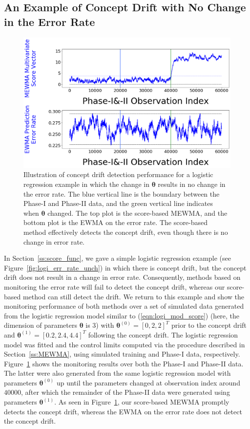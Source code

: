 \documentclass[twoside,11pt]{article}
\begin{document}
\subsection{An Example of Concept Drift with No Change in the Error Rate}
\label{ss:cd_no_err_change}
\begin{figure}[!htp]
\centering
\includegraphics[width = .8\linewidth]{../figures/v14/sim_11/non_nnet_nonunif_ch_f_0_2/1_sim11_logi_1e-08_0_0015_1.png}
  \caption{Illustration of concept drift detection performance for a logistic regression example in which the change in $\bm{\theta}$ results in no change in the error rate. The blue vertical line is the boundary between the Phase-I and Phase-II data, and the green vertical line indicates when $\bm{\theta}$ changed. The top plot is the score-based MEWMA, and the bottom plot is the EWMA on the error rate. The score-based method effectively detects the concept drift, even though there is no change in error rate.}
  \label{fig:exp_no_err_ch}
\end{figure}
In Section~\ref{ss:score_func}, we gave a simple logistic regression example (see Figure~\ref{fig:logi_err_rate_unch}) in which there is concept drift, but the concept drift does not result in a change in error rate. Consequently, methods based on monitoring the error rate will fail to detect the concept drift, whereas our score-based method can still detect the drift. We return to this example and show the monitoring performance of both methods over a set of simulated data generated from the logistic regression model similar to (\ref{eqn:logi_mod_score}) (here, the dimension of parameters $\bm{\theta}$ is $3$) with $\bm{\theta}^{(0)} = [0,2,2]^T$ prior to the concept drift and $\bm{\theta}^{(1)} = [0.2,2.4,4.4]^T$ following the concept drift. The logistic regression model was fitted and the control limits computed via the procedure described in Section~\ref{ss:MEWMA}, using simulated training and Phase-I data, respectively. Figure~\ref{fig:exp_no_err_ch} shows the monitoring results over both the Phase-I and Phase-II data. The latter were also generated from the same logistic regression model with parameters $\bm{\theta}^{(0)}$ up until the parameters changed at observation index around $40000$, after which the remainder of the Phase-II data were generated using parameters $\bm{\theta}^{(1)}$. As seen in Figure~\ref{fig:exp_no_err_ch}, our score-based MEWMA promptly detects the concept drift, whereas the EWMA on the error rate does not detect the concept drift. 
\end{document}
